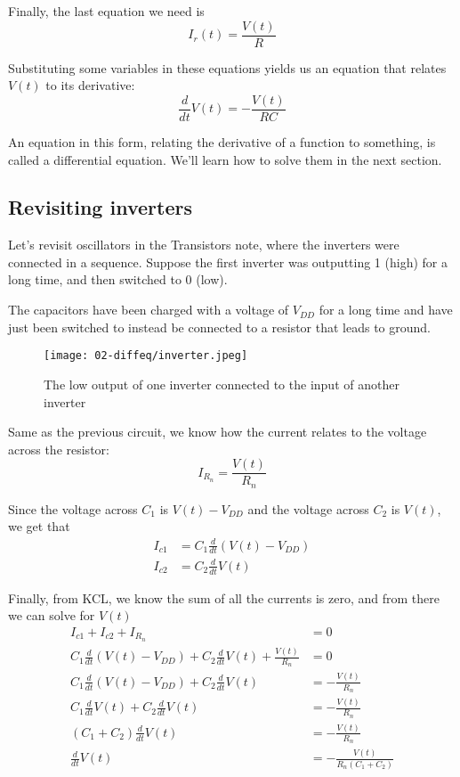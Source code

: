 \documentclass[11pt]{article}
\begin{document}
Finally, the last equation we need is \[I_r(t)=\frac{V(t)}{R}\]

Substituting some variables in these equations yields us an equation that relates $V(t)$ to its derivative: \[\frac d{dt}V(t)=-\frac{V(t)}{RC}\]

An equation in this form, relating the derivative of a function to something, is called a differential equation. We'll learn how to solve them in the next section.

\subsection{Revisiting inverters}

Let's revisit oscillators in the Transistors note, where the inverters were connected in a sequence. Suppose the first inverter was outputting 1 (high) for a long time, and then switched to 0 (low). 

The capacitors have been charged with a voltage of $V_{DD}$ for a long time and have just been switched to instead be connected to a resistor that leads to ground.

\begin{figure}[H]
    \centering
        \texttt{[image: 02-diffeq/inverter.jpeg]}
    \caption{The low output of one inverter connected to the input of another inverter}
\end{figure}

Same as the previous circuit, we know how the current relates to the voltage across the resistor: \[I_{R_n}=\frac{V(t)}{R_n}\]

Since the voltage across $C_1$ is $V(t)-V_{DD}$ and the voltage across $C_2$ is $V(t)$, we get that
\begin{align*}
    I_{c1}&=C_1\frac d{dt}(V(t)-V_{DD})\\
    I_{c2}&=C_2\frac d{dt}V(t)
\end{align*}

Finally, from KCL, we know the sum of all the currents is zero, and from there we can solve for $V(t)$
\begin{align*}
    I_{c1}+I_{c2}+I_{R_n}&=0\\
    C_1\frac d{dt}(V(t)-V_{DD})+C_2\frac d{dt}V(t)+\frac{V(t)}{R_n}&=0\\
    C_1\frac d{dt}(V(t)-V_{DD})+C_2\frac d{dt}V(t)&=-\frac{V(t)}{R_n}\\
    C_1\frac d{dt}V(t)+C_2\frac d{dt}V(t)&=-\frac{V(t)}{R_n}\\
    (C_1+C_2)\frac d{dt}V(t)&=-\frac{V(t)}{R_n}\\
    \frac d{dt}V(t)&=-\frac{V(t)}{R_n(C_1+C_2)}
\end{align*}
\end{document}
